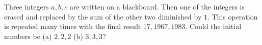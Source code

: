 Three integers $a, b, c$ are written on a blackboard. Then one of the integers is erased and replaced by the sum of the other two diminished by $1$. This operation is repeated many times with the final result $17, 1967, 1983$. Could the initial numbers be (a) $2, 2, 2$ (b) $3, 3, 3$?
